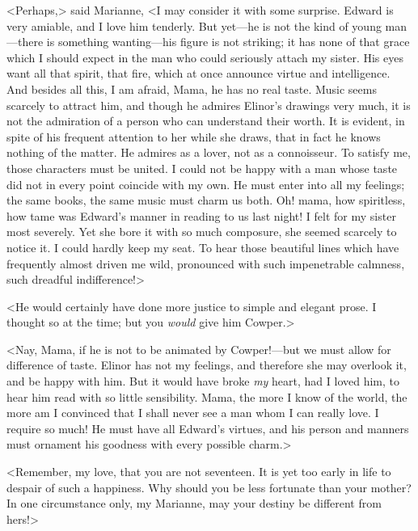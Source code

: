 <Perhaps,> said Marianne, <I may consider it with some surprise. Edward is very amiable, and I love him tenderly. But yet—he is not the kind of young man—there is something wanting—his figure is not striking; it has none of that grace which I should expect in the man who could seriously attach my sister. His eyes want all that spirit, that fire, which at once announce virtue and intelligence. And besides all this, I am afraid, Mama, he has no real taste. Music seems scarcely to attract him, and though he admires Elinor's drawings very much, it is not the admiration of a person who can understand their worth. It is evident, in spite of his frequent attention to her while she draws, that in fact he knows nothing of the matter. He admires as a lover, not as a connoisseur. To satisfy me, those characters must be united. I could not be happy with a man whose taste did not in every point coincide with my own. He must enter into all my feelings; the same books, the same music must charm us both. Oh! mama, how spiritless, how tame was Edward's manner in reading to us last night! I felt for my sister most severely. Yet she bore it with so much composure, she seemed scarcely to notice it. I could hardly keep my seat. To hear those beautiful lines which have frequently almost driven me wild, pronounced with such impenetrable calmness, such dreadful indifference!>

<He would certainly have done more justice to simple and elegant prose. I thought so at the time; but you \textit{would} give him Cowper.>

<Nay, Mama, if he is not to be animated by Cowper!—but we must allow for difference of taste. Elinor has not my feelings, and therefore she may overlook it, and be happy with him. But it would have broke \textit{my} heart, had I loved him, to hear him read with so little sensibility. Mama, the more I know of the world, the more am I convinced that I shall never see a man whom I can really love. I require so much! He must have all Edward's virtues, and his person and manners must ornament his goodness with every possible charm.>

<Remember, my love, that you are not seventeen. It is yet too early in life to despair of such a happiness. Why should you be less fortunate than your mother? In one circumstance only, my Marianne, may your destiny be different from hers!>

